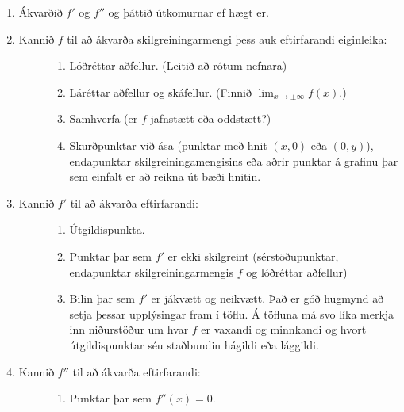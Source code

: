 \documentclass[b5paper,11pt,icelandic]{sphinxmanual}
\begin{document}
\begin{enumerate}
\item {} 
Ákvarðið \(f'\) og \(f''\) og þáttið útkomurnar ef hægt er.

\item {} \begin{description}
\item[{Kannið \(f\) til að ákvarða skilgreiningarmengi þess auk eftirfarandi eiginleika:}] \leavevmode\begin{enumerate}
\item {} 
Lóðréttar aðfellur. (Leitið að rótum nefnara)

\item {} 
Láréttar aðfellur og skáfellur. (Finnið \(\lim_{x \to \pm\infty}f(x)\).)

\item {} 
Samhverfa (er \(f\) jafnstætt eða oddstætt?)

\item {} 
Skurðpunktar við ása (punktar með hnit \((x,0)\) eða \((0,y)\)), endapunktar skilgreiningamengisins eða aðrir punktar á grafinu þar sem einfalt er að reikna út bæði hnitin.

\end{enumerate}

\end{description}

\item {} \begin{description}
\item[{Kannið \(f'\) til að ákvarða eftirfarandi:}] \leavevmode\begin{enumerate}
\item {} 
Útgildispunkta.

\item {} 
Punktar þar sem \(f'\) er ekki skilgreint (sérstöðupunktar, endapunktar skilgreiningarmengis \(f\) og lóðréttar aðfellur)

\item {} 
Bilin þar sem \(f'\) er jákvætt
og neikvætt. Það er góð hugmynd að setja þessar upplýsingar fram í töflu. Á töfluna má svo líka merkja inn niðurstöður um hvar \(f\) er vaxandi og minnkandi og hvort útgildispunktar séu staðbundin hágildi eða lággildi.

\end{enumerate}

\end{description}

\item {} \begin{description}
\item[{Kannið \(f''\) til að ákvarða eftirfarandi:}] \leavevmode\begin{enumerate}
\item {} 
Punktar þar sem \(f''(x)=0\).


\end{enumerate}
\end{description}
\end{enumerate}
\end{document}
